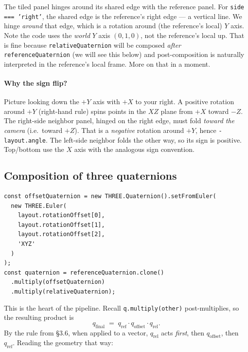 \documentclass{article}
\begin{document}
The tiled panel hinges around its shared edge with the reference panel.
For \texttt{side === 'right'}, the shared edge is the reference's right
edge --- a vertical line. We hinge \emph{around} that edge, which is a
rotation around (the reference's local) $Y$ axis. Note the code uses
the \emph{world} $Y$ axis $(0,1,0)$, not the reference's local up. That
is fine because \texttt{relativeQuaternion} will be composed
\emph{after} \texttt{referenceQuaternion} (we will see this below) and
post-composition is naturally interpreted in the reference's local
frame. More on that in a moment.

\paragraph{Why the sign flip?} Picture looking down the $+Y$ axis with
$+X$ to your right. A positive rotation around $+Y$ (right-hand rule)
spins points in the $XZ$ plane from $+X$ toward $-Z$. The right-side
neighbor panel, hinged on the right edge, must fold \emph{toward the
camera} (i.e.\ toward $+Z$). That is a \emph{negative} rotation around
$+Y$, hence \texttt{-layout.angle}. The left-side neighbor folds the
other way, so its sign is positive. Top/bottom use the $X$ axis with the
analogous sign convention.

\subsection{Composition of three quaternions}

\begin{lstlisting}
const offsetQuaternion = new THREE.Quaternion().setFromEuler(
  new THREE.Euler(
    layout.rotationOffset[0],
    layout.rotationOffset[1],
    layout.rotationOffset[2],
    'XYZ'
  )
);
const quaternion = referenceQuaternion.clone()
  .multiply(offsetQuaternion)
  .multiply(relativeQuaternion);
\end{lstlisting}

This is the heart of the pipeline. Recall \texttt{q.multiply(other)}
post-multiplies, so the resulting product is
\[
  q_{\text{final}} \;=\; q_{\text{ref}} \cdot q_{\text{offset}} \cdot q_{\text{rel}}.
\]
By the rule from \S 3.6, when applied to a vector, $q_{\text{rel}}$ acts
\emph{first}, then $q_{\text{offset}}$, then $q_{\text{ref}}$. Reading
the geometry that way:
\end{document}
